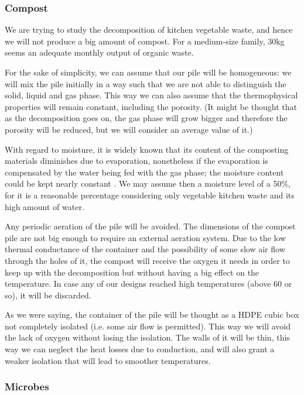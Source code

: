 \documentclass[12pt, a4paper, twocolumn]{article}
\numberwithin{table}{section}
\numberwithin{figure}{section}
\numberwithin{equation}{section}
\begin{document}
\subsubsection{Compost}

We are trying to study the decomposition of kitchen vegetable waste, and hence we will not produce a big amount of compost. For a medium-size family, \si{30}{kg} seems an adequate monthly output of organic waste. 

For the sake of simplicity, we can assume that our pile will be homogeneous: we will mix the pile initially in a way such that we are not able to distinguish the solid, liquid and gas phase. This way we can also assume that the thermophysical properties will remain constant, including the porosity. (It might be thought that as the decomposition goes on, the gas phase will grow bigger and therefore the porosity will be reduced, but we will consider an average value of it.) %

With regard to moisture, it is widely known that its content of the composting materials diminishes due to evaporation, nonetheless if the evaporation is compensated by the water being fed with the gas phase; the moisture content could be kept nearly constant \cite{niceassumptions}. We may assume then a moisture level of a 50\%, for it is a reasonable percentage considering only vegetable kitchen waste and its high amount of water. 

Any periodic aeration of the pile will be avoided. The dimensions of the compost pile are not big enough to require an external aeration system. Due to the low thermal conductance of the container and the possibility of some slow air flow through the holes of it, the compost will receive the oxygen it needs in order to keep up with the decomposition but without having a big effect on the temperature. In case any of our designs reached high temperatures (above \si{60}{\celsius} or so), it will be discarded. 

As we were saying, the container of the pile will be thought as a HDPE cubic box not completely isolated (i.e. some air flow is permitted). This way we will avoid the lack of oxygen without losing the isolation. The walls of it will be thin, this way we can neglect the heat losses due to conduction, and will also grant a weaker isolation that will lead to smoother temperatures. 

\subsubsection{Microbes}
\end{document}
